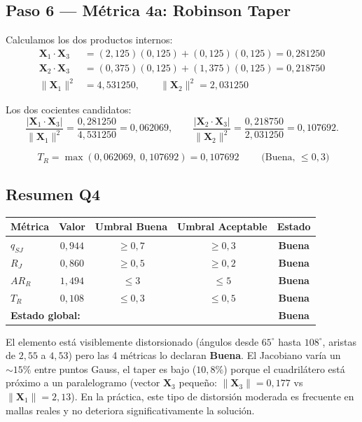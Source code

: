 \documentclass[11pt,a4paper]{article}
\begin{document}
\subsection{Paso 6 --- M\'etrica 4a: Robinson Taper}
Calculamos los dos productos internos:
\begin{align*}
\mathbf{X}_1\cdot\mathbf{X}_3 &= (2{,}125)(0{,}125)+(0{,}125)(0{,}125) = 0{,}281250 \\
\mathbf{X}_2\cdot\mathbf{X}_3 &= (0{,}375)(0{,}125)+(1{,}375)(0{,}125) = 0{,}218750 \\
\|\mathbf{X}_1\|^2 &= 4{,}531250,\qquad \|\mathbf{X}_2\|^2 = 2{,}031250
\end{align*}

Los dos cocientes candidatos:
\[
\frac{|\mathbf{X}_1\!\cdot\!\mathbf{X}_3|}{\|\mathbf{X}_1\|^2} = \frac{0{,}281250}{4{,}531250} = 0{,}062069,\qquad
\frac{|\mathbf{X}_2\!\cdot\!\mathbf{X}_3|}{\|\mathbf{X}_2\|^2} = \frac{0{,}218750}{2{,}031250} = 0{,}107692.
\]

\begin{resultbox}[title={M\'etrica 4a: Robinson Taper Q4}]
\[
\boxed{\;T_R = \max(0{,}062069,\;0{,}107692) = 0{,}107692\;} \qquad \text{(Buena, $\le 0{,}3$)}
\]
\end{resultbox}

\subsection{Resumen Q4}
\begin{center}
\renewcommand{\arraystretch}{1.2}
\begin{tabular}{lcccc}
\toprule
M\'etrica & Valor & Umbral Buena & Umbral Aceptable & Estado \\
\midrule
$q_{SJ}$  & $0{,}944$ & $\ge 0{,}7$ & $\ge 0{,}3$ & \textcolor{good}{\textbf{Buena}} \\
$R_J$     & $0{,}860$ & $\ge 0{,}5$ & $\ge 0{,}2$ & \textcolor{good}{\textbf{Buena}} \\
$AR_R$    & $1{,}494$ & $\le 3$     & $\le 5$     & \textcolor{good}{\textbf{Buena}} \\
$T_R$     & $0{,}108$ & $\le 0{,}3$ & $\le 0{,}5$ & \textcolor{good}{\textbf{Buena}} \\
\midrule
\multicolumn{4}{l}{\textbf{Estado global:}} & \textcolor{good}{\textbf{Buena}} \\
\bottomrule
\end{tabular}
\end{center}

\begin{interpretbox}[title={Interpretaci\'on pedag\'ogica Q4}]
El elemento est\'a visiblemente distorsionado (\'angulos desde $65^\circ$ hasta $108^\circ$, aristas de $2{,}55$ a $4{,}53$) pero las 4 m\'etricas lo declaran \textbf{Buena}. El Jacobiano var\'ia un $\sim\!15\%$ entre puntos Gauss, el taper es bajo ($10{,}8\%$) porque el cuadril\'atero est\'a pr\'oximo a un paralelogramo (vector $\mathbf{X}_3$ peque\~no: $\|\mathbf{X}_3\|=0{,}177$ vs $\|\mathbf{X}_1\|=2{,}13$). En la pr\'actica, este tipo de distorsi\'on moderada es frecuente en mallas reales y no deteriora significativamente la soluci\'on.
\end{interpretbox}
\end{document}
